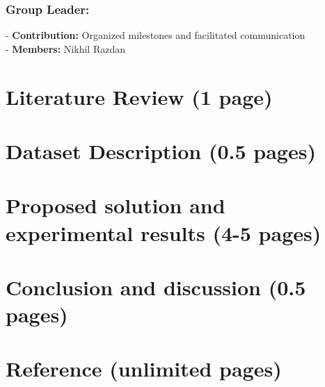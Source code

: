 \documentclass{article}
\begin{document}
\subsubsection*{Group Leader:}
- \textbf{Contribution:} Organized milestones and facilitated communication \\
- \textbf{Members:} Nikhil Razdan

\section*{Literature Review (1 page)}
\section*{Dataset Description (0.5 pages)}
\section*{Proposed solution and experimental results (4-5 pages)}
\section*{Conclusion and discussion (0.5 pages)}
\section*{Reference (unlimited pages)}
\end{document}
